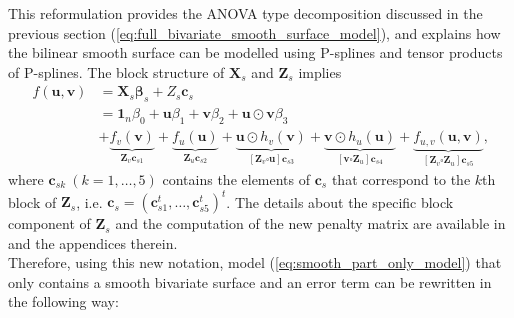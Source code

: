 This reformulation provides the ANOVA type decomposition discussed in the previous section 
(\ref{eq:full_bivariate_smooth_surface_model}), and explains how the bilinear smooth surface can be modelled using P-splines and 
tensor products of P-splines.
The block structure of $\mathbf{X}_s$ and $\mathbf{Z}_s$ implies
\[
    \begin{aligned} 
        f(\boldsymbol{u}, \boldsymbol{v}) & =\boldsymbol{X}_{s} \boldsymbol{\beta}_{s}+Z_{s} \boldsymbol{c}_{s} \\ 
        								  & =\mathbf{1}_{n} \beta_{0}+\boldsymbol{u} \beta_{1}+\boldsymbol{v} \beta_{2}+
        								  \boldsymbol{u} \odot \boldsymbol{v} \beta_{3} \\
        								  & + \underbrace{f_{v}(\boldsymbol{v})}_{\boldsymbol{Z}_{v} \boldsymbol{c}_{s 1}}+
        								  \underbrace{f_{u}(\boldsymbol{u})}_{\boldsymbol{Z}_{u} \boldsymbol{c}_{s 2}} +
        								  \underbrace{\boldsymbol{u} \odot h_{v}(\boldsymbol{v})}_{\left[\boldsymbol{Z}_{v} 
        								  \square \boldsymbol{u}\right] \boldsymbol{c}_{s 3}}+\underbrace{\boldsymbol{v} \odot 
        								  h_{u}(\boldsymbol{u})}_{\left[\boldsymbol{v} \square \boldsymbol{Z}_{u}\right] 
        								  \boldsymbol{c}_{s 4}} +\underbrace{f_{u, v}(\boldsymbol{u}, \boldsymbol{v})}
        								  _{\left[\boldsymbol{Z}_{v} \square \boldsymbol{Z}_{u}\right] \boldsymbol{c}_{s 5}}
        								  \text{,}
    \end{aligned}
\]
where $\boldsymbol{c}_{sk} \ (k = 1,\ldots,5)$ contains the elements of $\boldsymbol{c}_s$ that correspond to the $k$th block of $\boldsymbol{Z}_s$, i.e. $\boldsymbol{c}_s = (\boldsymbol{c}_{s1}^t,\ldots,\boldsymbol{c}_{s5}^t)^t$. The details about the specific block component of $\boldsymbol{Z}_s$ and the computation of the new penalty matrix are available in  \textcite{rodriguez-alvarez_correcting_2018} and the appendices therein.\\

Therefore, using this new notation, model (\ref{eq:smooth_part_only_model}) that only contains a smooth bivariate surface and an error term can be rewritten in the following way:

